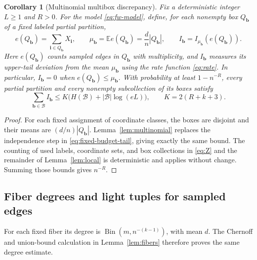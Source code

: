 \documentclass[11pt,reqno]{amsart}
\numberwithin{equation}{section}
\newtheorem{corollary}[theorem]{Corollary}
\theoremstyle{definition}
\theoremstyle{remark}
\newcommand{\E}{\mathbb E}
\begin{document}
\begin{corollary}[Multinomial multibox discrepancy]\label{cor:multi-local}
Fix a deterministic integer $L\ge1$ and $R>0$.
For the model \eqref{eq:fw-model}, define, for each nonempty box
$Q_{\mathbf{b}}$ of a fixed labeled partial partition,
\[
 e(Q_{\mathbf{b}})=\sum_{\mathbf i\in Q_{\mathbf{b}}}X_{\mathbf i},
 \qquad \mu_{\mathbf{b}}=\E e(Q_{\mathbf{b}})=\frac dn|Q_{\mathbf{b}}|,
 \qquad I_{\mathbf{b}}=I_{\mu_{\mathbf{b}}}(e(Q_{\mathbf{b}})).
\]
Here $e(Q_{\mathbf{b}})$ counts sampled edges in $Q_{\mathbf{b}}$ with
multiplicity, and $I_{\mathbf{b}}$ measures its upper-tail deviation
from the mean $\mu_{\mathbf{b}}$ using the rate function
\eqref{eq:rate}. In particular, $I_{\mathbf{b}}=0$ when
$e(Q_{\mathbf{b}})\le\mu_{\mathbf{b}}$.
With probability at least $1-n^{-R}$, every partial
partition and every nonempty subcollection of its boxes satisfy
\[
 \sum_{\mathbf{b}\in\mathcal B}I_{\mathbf{b}}
 \le K\bigl(H(\mathcal B)+|\mathcal B|\log(eL)\bigr),
 \qquad K=2(R+k+3).
\]
\end{corollary}
\begin{proof}
For each fixed assignment of coordinate classes, the boxes are
disjoint and their means are $(d/n)|Q_{\mathbf{b}}|$.
Lemma~\ref{lem:multinomial} replaces the independence step in
\eqref{eq:fixed-budget-tail}, giving exactly the same bound.
The counting of used labels, coordinate sets, and box collections
in \eqref{eq:Z} and the remainder of Lemma~\ref{lem:local} is
deterministic and applies without change. Summing those bounds
gives $n^{-R}$.
\end{proof}

\subsection{Fiber degrees and light tuples for sampled edges}

For each fixed fiber its degree is
$\operatorname{Bin}(m,n^{-(k-1)})$, with mean $d$.
The Chernoff and union-bound calculation in
Lemma~\ref{lem:fibers} therefore proves the same degree estimate.
\end{document}
